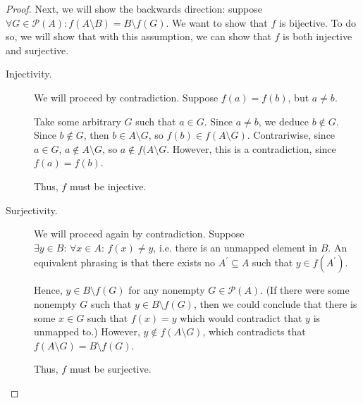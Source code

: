 \documentclass[11pt,letterpaper]{article}
\begin{document}
\begin{proof}
    Next, we will show the backwards direction: suppose
    $\forall G \in \mathcal{P}(A): f(A \setminus B) = B \setminus f(G)$. We
    want to show that $f$ is bijective. To do so, we will show that with this
    assumption, we can show that $f$ is both injective and surjective.

    \begin{description}
        \item[Injectivity.] We will proceed by contradiction.
            Suppose $f(a) = f(b)$, but $a \neq b$.

            Take some arbitrary $G$ such that $a \in G$. Since $a \neq b$, we
            deduce $b \notin G$. Since $b \notin G$, then
            $b \in A \setminus G$, so
            $f(b) \in f(A \setminus G)$.
            Contrariwise, since $a \in G$,
            $a \notin A \setminus G$, so $a \notin f(A \setminus G$.
            However, this is a contradiction, since $f(a) = f(b)$.

            Thus, $f$ must be injective.

        \item[Surjectivity.] We will proceed again by contradiction.
            Suppose $\exists y \in B:\, \forall x \in A:\, f(x) \neq y$, i.e.
            there is an unmapped element in $B$. An equivalent phrasing is that
            there exists no $A^\prime \subseteq A$ such that $y \in
            f(A^\prime)$.

            Hence, $y \in B \setminus f(G)$ for any nonempty
            $G \in \mathcal{P}(A)$. (If there were some nonempty $G$ such that
            $y \in B \setminus f(G)$, then we could conclude that there is some
            $x \in G$ such that $f(x) = y$ which would contradict that $y$ is
            unmapped to.) However, $y \notin f(A \setminus G)$, which
            contradicts that $f(A \setminus G) = B \setminus f(G)$.

            Thus, $f$ must be surjective.
    \end{description}
\end{proof}
\end{document}
